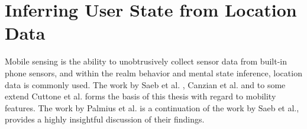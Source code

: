 \section{Inferring User State from Location Data}





Mobile sensing is the ability to unobtrusively collect sensor data from built-in phone sensors, and within the realm behavior and mental state inference, location data is commonly used. The work by Saeb et al. \cite{Saeb2015}, Canzian et al. \cite{Canzian2015}  and to some extend Cuttone et al. \cite{sparse-location-2014} forms the basis of this thesis with regard to mobility features. The work by Palmius et al. \cite{palmius2017} is a continuation of the work by Saeb et al., provides a highly insightful discussion of their findings.\\

